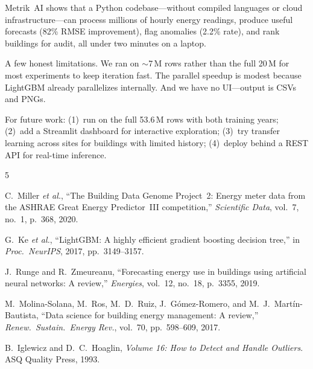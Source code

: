 \documentclass[conference]{IEEEtran}
\begin{document}
Metrik~AI shows that a Python codebase---without compiled languages or cloud infrastructure---can process millions of hourly energy readings, produce useful forecasts (82\% RMSE improvement), flag anomalies (2.2\% rate), and rank buildings for audit, all under two minutes on a laptop.

A few honest limitations. We ran on $\sim$7\,M rows rather than the full 20\,M for most experiments to keep iteration fast. The parallel speedup is modest because LightGBM already parallelizes internally. And we have no UI---output is CSVs and PNGs.

For future work: (1)~run on the full 53.6\,M rows with both training years; (2)~add a Streamlit dashboard for interactive exploration; (3)~try transfer learning across sites for buildings with limited history; (4)~deploy behind a REST API for real-time inference.

\balance

\begin{thebibliography}{5}

C.~Miller \textit{et al.},
``The Building Data Genome Project~2: Energy meter data from the ASHRAE Great Energy Predictor~III competition,''
\textit{Scientific Data}, vol.~7, no.~1, p.~368, 2020.

G.~Ke \textit{et al.},
``LightGBM: A highly efficient gradient boosting decision tree,''
in \textit{Proc.\ NeurIPS}, 2017, pp.~3149--3157.

J.~Runge and R.~Zmeureanu,
``Forecasting energy use in buildings using artificial neural networks: A review,''
\textit{Energies}, vol.~12, no.~18, p.~3355, 2019.

M.~Molina-Solana, M.~Ros, M.~D.~Ruiz, J.~G{\'o}mez-Romero, and M.~J.~Mart{\'i}n-Bautista,
``Data science for building energy management: A review,''
\textit{Renew.\ Sustain.\ Energy Rev.}, vol.~70, pp.~598--609, 2017.

B.~Iglewicz and D.~C.~Hoaglin,
\textit{Volume 16: How to Detect and Handle Outliers}.
ASQ Quality Press, 1993.

\end{thebibliography}
\end{document}
